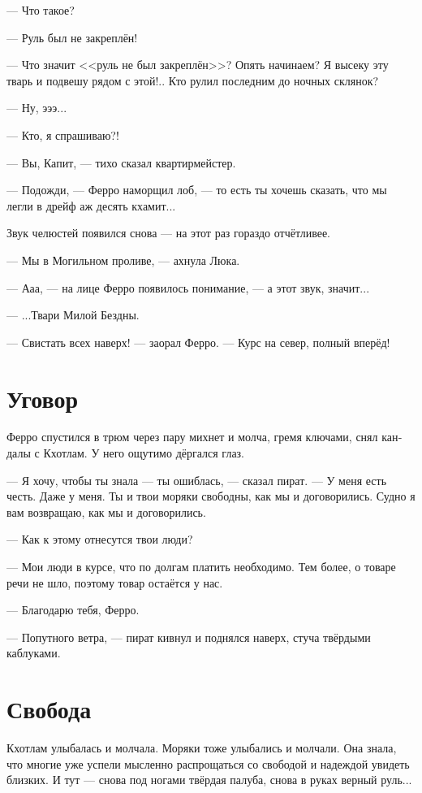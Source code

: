 \documentclass[a4paper,12pt,fleqn]{book}\usepackage{cooltooltips}\usepackage{polyglossia}\setdefaultlanguage{russian}\setotherlanguage{english}\defaultfontfeatures{Ligatures=TeX,Mapping=tex-text} \usepackage{xcolor}\definecolor{lightgray}{HTML}{bbbbbb}\color{lightgray}\newcommand{\ml}[3]{\textenglish{\textcolor{black}{#3}}}
\begin{document}
--- Что такое?

--- Руль был не закреплён!

--- Что значит <<руль не был закреплён>>?
Опять начинаем?
Я высеку эту тварь и подвешу рядом с этой!..
Кто рулил последним до ночных склянок?

--- Ну, эээ...

--- Кто, я спрашиваю?!

--- Вы, Капит, --- тихо сказал квартирмейстер.

--- Подожди, --- Ферро наморщил лоб, --- то есть ты хочешь сказать, что мы легли в дрейф аж десять кхамит...

Звук челюстей появился снова --- на этот раз гораздо отчётливее.

--- Мы в Могильном проливе, --- ахнула Люка.

--- Ааа, --- на лице Ферро появилось понимание, --- а этот звук, значит...

--- ...Твари Милой Бездны.

--- Свистать всех наверх! --- заорал Ферро.
--- Курс на север, полный вперёд!

\section{Уговор}

Ферро спустился в трюм через пару михнет и молча, гремя ключами, снял кандалы с Кхотлам.
У него ощутимо дёргался глаз.

--- Я хочу, чтобы ты знала --- ты ошиблась, --- сказал пират.
--- У меня есть честь.
Даже у меня.
Ты и твои моряки свободны, как мы и договорились.
Судно я вам возвращаю, как мы и договорились.

--- Как к этому отнесутся твои люди?

--- Мои люди в курсе, что по долгам платить необходимо.
Тем более, о товаре речи не шло, поэтому товар остаётся у нас.

--- Благодарю тебя, Ферро.

--- Попутного ветра, --- пират кивнул и поднялся наверх, стуча твёрдыми каблуками.

\section{Свобода}

Кхотлам улыбалась и молчала.
Моряки тоже улыбались и молчали.
Она знала, что многие уже успели мысленно распрощаться со свободой и надеждой увидеть близких.
И тут --- снова под ногами твёрдая палуба, снова в руках верный руль...
\end{document}
